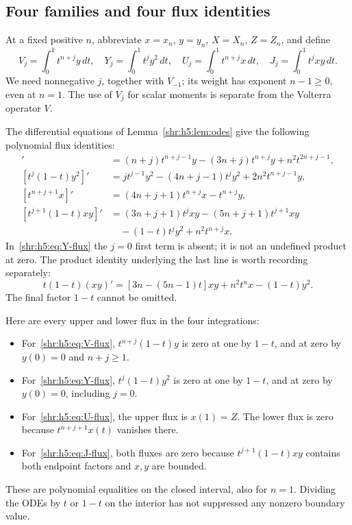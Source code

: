 \documentclass[11pt,letterpaper]{article}
\numberwithin{equation}{section}
\theoremstyle{definition}
\newcommand{\1}{\mathbf 1}
\newcommand{\dd}{\,d}
\begin{document}
\subsection{Four families and four flux identities}
At a fixed positive $n$, abbreviate $x=x_n$, $y=y_n$, $X=X_n$,
$Z=Z_n$, and define
\begin{equation}
 V_j=\int_0^1t^{n+j}y\dd t,\quad
 Y_j=\int_0^1t^jy^2\dd t,\quad
 U_j=\int_0^1t^{n+j}x\dd t,\quad
 J_j=\int_0^1t^jxy\dd t.
 \label{shr:h5:eq:moment-defs}
\end{equation}
We need nonnegative $j$, together with $V_{-1}$; its weight has exponent
$n-1\ge0$, even at $n=1$. The use of $V_j$ for scalar moments is
separate from the Volterra operator $V$.

The differential equations of Lemma~\ref{shr:h5:lem:odes} give the following
polynomial flux identities:
\begin{align}
 [t^{n+j}(1-t)y]'&=(n+j)t^{n+j-1}y-(3n+j)t^{n+j}y
                         +n^2t^{2n+j-1},
 \label{shr:h5:eq:V-flux}\\
 [t^j(1-t)y^2]'&=jt^{j-1}y^2-(4n+j-1)t^jy^2
                         +2n^2t^{n+j-1}y,
 \label{shr:h5:eq:Y-flux}\\
 [t^{n+j+1}x]'&=(4n+j+1)t^{n+j}x-t^{n+j}y,
 \label{shr:h5:eq:U-flux}\\
 [t^{j+1}(1-t)xy]'&=(3n+j+1)t^jxy-(5n+j+1)t^{j+1}xy\\
     &\hspace{1em}-(1-t)t^jy^2+n^2t^{n+j}x.
 \label{shr:h5:eq:J-flux}
\end{align}
In~\eqref{shr:h5:eq:Y-flux} the $j=0$ first term is absent; it is not an
undefined product at zero. The product identity underlying the last line
is worth recording separately:
\begin{equation}
 t(1-t)(xy)'=[3n-(5n-1)t]xy+n^2t^nx-(1-t)y^2.
 \label{shr:h5:eq:xy-ode}
\end{equation}
The final factor $1-t$ cannot be omitted.

Here are every upper and lower flux in the four integrations:
\begin{itemize}
\item For~\eqref{shr:h5:eq:V-flux}, $t^{n+j}(1-t)y$ is zero at one by
$1-t$, and at zero by $y(0)=0$ and $n+j\ge1$.
\item For~\eqref{shr:h5:eq:Y-flux}, $t^j(1-t)y^2$ is zero at one by
$1-t$, and at zero by $y(0)=0$, including $j=0$.
\item For~\eqref{shr:h5:eq:U-flux}, the upper flux is $x(1)=Z$.
The lower flux is zero because $t^{n+j+1}x(t)$ vanishes there.
\item For~\eqref{shr:h5:eq:J-flux}, both fluxes are zero because
$t^{j+1}(1-t)xy$ contains both endpoint factors and $x,y$ are bounded.
\end{itemize}
These are polynomial equalities on the closed interval, also for $n=1$.
Dividing the ODEs by $t$ or $1-t$ on the interior has not suppressed any
nonzero boundary value.
\end{document}
